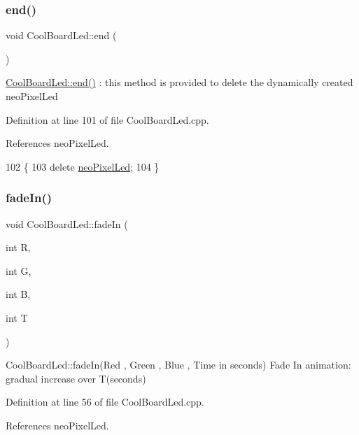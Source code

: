 \mbox{\label{classCoolBoardLed_a69f323359e0c9f797422f2152b5d41ef}} 
\subsubsection{\texorpdfstring{end()}{end()}}
{\footnotesize\ttfamily void Cool\+Board\+Led\+::end (\begin{DoxyParamCaption}{ }\end{DoxyParamCaption})}

\hyperlink{classCoolBoardLed_a69f323359e0c9f797422f2152b5d41ef}{Cool\+Board\+Led\+::end()} \+: this method is provided to delete the dynamically created neo\+Pixel\+Led 

Definition at line 101 of file Cool\+Board\+Led.\+cpp.



References neo\+Pixel\+Led.


\begin{DoxyCode}
102 \{
103     \textcolor{keyword}{delete} \hyperlink{classCoolBoardLed_ac2c13fa462a010cd9242bf297c013923}{neoPixelLed};
104 \}
\end{DoxyCode}
\mbox{\label{classCoolBoardLed_aec915442a8441c7cd45c3279d3ff8821}} 
\subsubsection{\texorpdfstring{fade\+In()}{fadeIn()}}
{\footnotesize\ttfamily void Cool\+Board\+Led\+::fade\+In (\begin{DoxyParamCaption}\item[{int}]{R,  }\item[{int}]{G,  }\item[{int}]{B,  }\item[{int}]{T }\end{DoxyParamCaption})}

Cool\+Board\+Led\+::fade\+In(\+Red , Green , Blue , Time in seconds) Fade In animation\+: gradual increase over T(seconds) 

Definition at line 56 of file Cool\+Board\+Led.\+cpp.



References neo\+Pixel\+Led.


